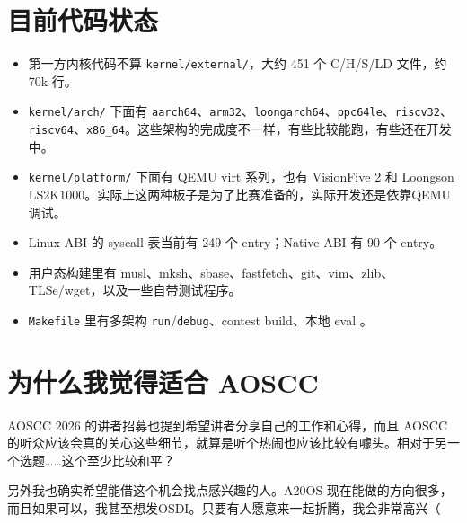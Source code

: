 \documentclass[UTF8,zihao=-4]{ctexart}
\begin{document}
\section*{目前代码状态}

\begin{itemize}
  \item 第一方内核代码不算 \texttt{kernel/external/}，大约 451 个 C/H/S/LD 文件，约 70k 行。
  \item \texttt{kernel/arch/} 下面有 \texttt{aarch64}、\texttt{arm32}、\texttt{loongarch64}、\texttt{ppc64le}、\texttt{riscv32}、\texttt{riscv64}、\texttt{x86\_64}。这些架构的完成度不一样，有些比较能跑，有些还在开发中。
  \item \texttt{kernel/platform/} 下面有 QEMU virt 系列，也有 VisionFive 2 和 Loongson LS2K1000。实际上这两种板子是为了比赛准备的，实际开发还是依靠QEMU调试。
  \item Linux ABI 的 syscall 表当前有 249 个 entry；Native ABI 有 90 个 entry。
  \item 用户态构建里有 musl、mksh、sbase、fastfetch、git、vim、zlib、TLSe/wget，以及一些自带测试程序。
  \item \texttt{Makefile} 里有多架构 \texttt{run}/\texttt{debug}、contest build、本地 eval 。
\end{itemize}

\section*{为什么我觉得适合 AOSCC}

AOSCC 2026 的讲者招募也提到希望讲者分享自己的工作和心得，而且 AOSCC 的听众应该会真的关心这些细节，就算是听个热闹也应该比较有噱头。相对于另一个选题……这个至少比较和平？

另外我也确实希望能借这个机会找点感兴趣的人。A20OS 现在能做的方向很多，而且如果可以，我甚至想发OSDI。只要有人愿意来一起折腾，我会非常高兴（
\end{document}
